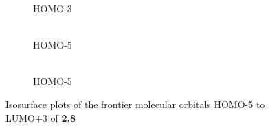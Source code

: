 \begin{figure}[!ht]
\begin{subfigure}[b]{0.31\textwidth}
  \caption{HOMO-3}
 \end{subfigure}
 \begin{subfigure}[b]{0.31\textwidth}
  \includegraphics[clip=true, width=\textwidth, keepaspectratio]{images/mos/8h-4.eps}
  \caption{HOMO-5}
 \end{subfigure}
 \begin{subfigure}[b]{0.31\textwidth}
  \includegraphics[clip=true, width=\textwidth, keepaspectratio]{images/mos/8h-5.eps}
  \caption{HOMO-5}
 \end{subfigure}
\caption[Molecular orbitals HOMO-5 to LUMO+3 of \textbf{2.8}]{Isosurface plots of the frontier molecular orbitals HOMO-5 to LUMO+3 of \textbf{2.8}}
\label{fig.mo28}
\end{figure}

